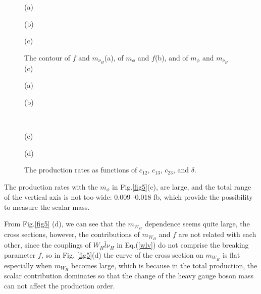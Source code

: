 \documentclass[preprint,aps,12pt,showpacs,nofootinbib,tightenlines]{revtex4}
\begin{document}
\def\figsubcap#1{\par\noindent\centering\footnotesize(#1)}
\begin{figure}[bht]
\begin{center}
\hspace{-2.5cm}
 \parbox{7.05cm}{ \vspace{-1.2cm}\figsubcap{a} }\hspace{1cm}
 \parbox{7.05cm}{ \vspace{-1.2cm}\figsubcap{b} }\hspace{-3cm}
 \parbox{9.05cm}{ \vspace{-1.2cm}\figsubcap{c} }
    \caption{ The contour of $f$ and $m_{\nu_H}$(a), of $m_\phi $ and $f$(b), and of $m_\phi $ and $m_{\nu_H}$ (c) \label{fig6} }
\end{center}
\end{figure}

\def\figsubcap#1{\par\noindent\centering\footnotesize(#1)}
\begin{figure}[bht]
\begin{center}
\hspace{-2.5cm}
 \parbox{7.05cm}{ \vspace{-1.2cm}\figsubcap{a} }
 \parbox{7.05cm}{ \vspace{-1.2cm}\figsubcap{b} } \\
 \hspace{-2.5cm}
 \parbox{7.05cm}{ \vspace{-1.2cm}\figsubcap{c} }
 \parbox{7.05cm}{ \vspace{-1.2cm}\figsubcap{d} }
    \caption{The production rates as functions of $c_{12}$, $c_{13}$, $c_{23}$, and $\delta$.  \label{fig7} }
\end{center}
\end{figure}
The production rates with the $m_\phi $ in  Fig.\ref{fig5}(c), are large, and the total range of
the vertical axis is not too wide: 0.009 -0.018 fb,
which provide the possibility to measure the scalar mass.

From Fig.\ref{fig5} (d), we can see that the $m_{W_H}$ dependence seems quite large, the cross sections, however,
the contributions of $m_{W_H}$ and $f$ are not related with each other, since the couplings of $W_H\bar l\nu_H $
in Eq.(\ref{wlv}) do not comprise the breaking parameter $f$, so in Fig. \ref{fig5}(d) the curve of the cross section
on $m_{W_H}$ is flat especially when $m_{W_H}$ becomes large, which is because in the total production, the scalar
contribution dominates so that the change of the heavy gauge boson mass can not affect the production order.
\end{document}
